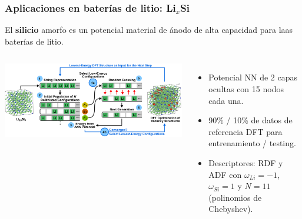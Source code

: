 \documentclass[aspectratio=169]{beamer}
\let\oldtextbf\textbf
\renewcommand{\textbf}[1]{\textcolor{nordblue}{\oldtextbf{#1}}}
\begin{document}
    \begin{frame}
        \frametitle{Aplicaciones en baterías de litio: Li$_x$Si}
        
        El \textbf{silicio} amorfo es un potencial material de ánodo de alta
        capacidad para laas baterías de litio.
        
        \begin{columns}
            \begin{center}
                \includegraphics[width=\columnwidth]{LiSi-metodo.png}
            \end{center}

            \pause
            
            \begin{itemize}
                \item Potencial NN de 2 capas ocultas con 15 nodos cada una.
                \item 90\% / 10\% de datos de referencia DFT para entrenamiento / 
                    testing.
                \item Descriptores: RDF y ADF con $\omega_{Li} = -1$, 
                    $\omega_{Si} = 1$ y $N = 11$ (polinomios de Chebyshev).
            \end{itemize}
        \end{columns}
            
    \end{frame}
    
\end{document}
